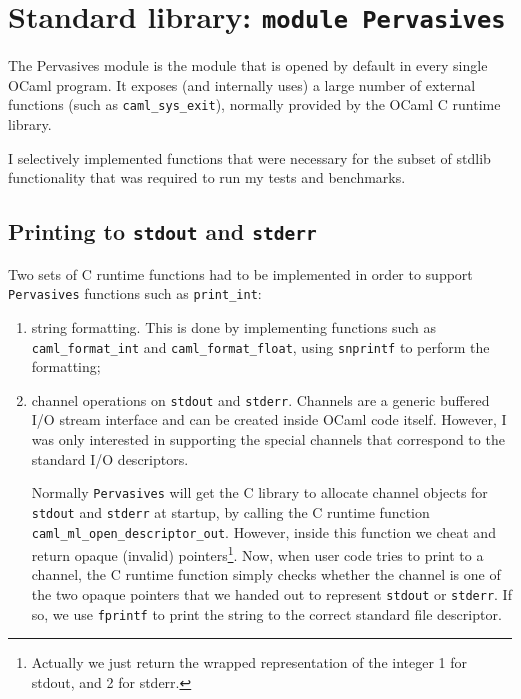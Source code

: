 \documentclass[12pt,a4paper,twoside,openright]{report}
\begin{document}
\section{Standard library: \texttt{module Pervasives}}\label{pervasives}

The Pervasives module is the module that is opened by default in every single OCaml program. It exposes (and internally uses) a large number of external
functions (such as \lstinline!caml_sys_exit!), normally
provided by the OCaml C runtime library.

I selectively implemented functions that were necessary for the subset of
stdlib functionality that was required to run my tests and benchmarks.

\subsection{Printing to \texttt{stdout} and \texttt{stderr}}\label{pervasives-printing}

Two sets of C runtime functions had to be implemented in order to support
\lstinline!Pervasives! functions such as \lstinline!print_int!:
\begin{enumerate}
  \item string formatting. This is done by implementing functions such as
    \lstinline!caml_format_int! and \lstinline!caml_format_float!, using
    \lstinline!snprintf! to perform the formatting;
  \item channel operations on \lstinline!stdout! and \lstinline!stderr!.
    Channels are a generic buffered I/O stream interface and can be created
    inside OCaml code itself. However, I was only interested in supporting the
    special channels that correspond to the standard I/O descriptors.

    Normally \lstinline!Pervasives! will get the C library to allocate channel
    objects for \lstinline!stdout! and \lstinline!stderr! at startup, by calling the C runtime function
    \lstinline!caml_ml_open_descriptor_out!. However,
    inside this function we cheat and return opaque (invalid)
    pointers\footnote{Actually we just return the wrapped representation of the integer 1
    for stdout, and 2 for stderr.}. Now, when user code tries to
    print to a channel, the C runtime function simply checks whether the channel is
    one of the two opaque pointers that we handed out to represent
    \lstinline!stdout! or \lstinline!stderr!. If so, we use \lstinline!fprintf!
    to print the string to the correct standard file descriptor.
\end{enumerate}
\end{document}
